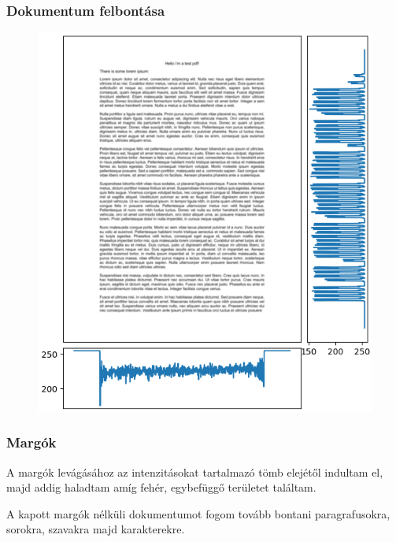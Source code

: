 \documentclass{beamer}
\begin{document}
\begin{frame}[fragile]
\frametitle{Dokumentum felbontása}

\begin{figure}[!tbp]
  \centering
  \begin{minipage}[b]{0.6\textwidth}
    \includegraphics[width=\textwidth]{images/intensity.png}
  \end{minipage}
\end{figure}

\end{frame}

\begin{frame}[fragile]
\frametitle{Margók}

A margók levágásához az intenzitásokat tartalmazó tömb elejétől indultam el, majd addig haladtam amíg fehér, egybefüggő területet találtam.

\bigskip

A kapott margók nélküli dokumentumot fogom tovább bontani paragrafusokra, sorokra, szavakra majd karakterekre.

\end{frame}
\end{document}
